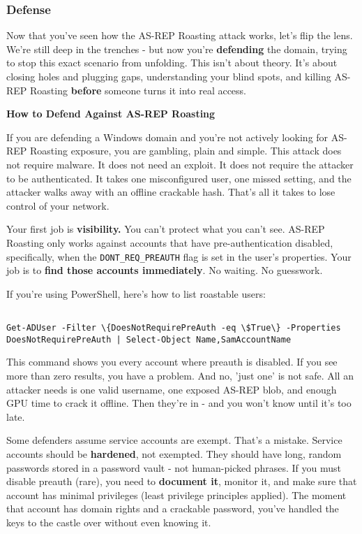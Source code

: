 \subsubsection{\textbf{Defense}}

Now that you’ve seen how the AS-REP Roasting attack works, let’s flip the lens. We’re still deep in the trenches - but now you’re \textbf{defending} the domain, trying to stop this exact scenario from unfolding. This isn’t about theory. It’s about closing holes and plugging gaps, understanding your blind spots, and killing AS-REP Roasting \textbf{before} someone turns it into real access.

\textbf{How to Defend Against AS-REP Roasting}

If you are defending a Windows domain and you’re not actively looking for AS-REP Roasting exposure, you are gambling, plain and simple. This attack does not require malware. It does not need an exploit. It does not require the attacker to be authenticated. It takes one misconfigured user, one missed setting, and the attacker walks away with an offline crackable hash. That’s all it takes to lose control of your network.

Your first job is \textbf{visibility. }You can’t protect what you can’t see. AS-REP Roasting only works against accounts that have pre-authentication disabled, specifically, when the \texttt{DONT\_REQ\_PREAUTH} flag is set in the user’s properties. Your job is to \textbf{find those accounts immediately}. No waiting. No guesswork.

If you’re using PowerShell, here’s how to list roastable users:

\begin{verbatim}

Get-ADUser -Filter \{DoesNotRequirePreAuth -eq \$True\} -Properties DoesNotRequirePreAuth | Select-Object Name,SamAccountName

\end{verbatim}

This command shows you every account where preauth is disabled. If you see more than zero results, you have a problem. And no, 'just one' is not safe. All an attacker needs is one valid username, one exposed AS-REP blob, and enough GPU time to crack it offline. Then they’re in - and you won’t know until it’s too late.

Some defenders assume service accounts are exempt. That’s a mistake. Service accounts should be \textbf{hardened}, not exempted. They should have long, random passwords stored in a password vault - not human-picked phrases. If you must disable preauth (rare), you need to \textbf{document it}, monitor it, and make sure that account has minimal privileges (least privilege principles applied). The moment that account has domain rights and a crackable password, you’ve handled the keys to the castle over without even knowing it.

